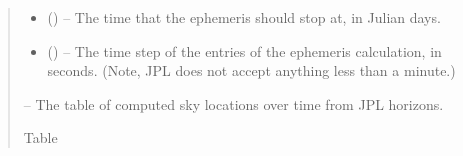 \documentclass[letterpaper,11pt,english]{sphinxmanual}
\begin{document}
\begin{savenotes}
\begin{fulllineitems}
\begin{savenotes}
\begin{fulllineitems}
\begin{quote}
\begin{description}
\begin{itemize}
\item {} 
\sphinxAtStartPar
{} () – The time that the ephemeris should stop at, in Julian days.

\item {} 
\sphinxAtStartPar
{} () – The time step of the entries of the ephemeris calculation, in
seconds. (Note, JPL does not accept anything less than a minute.)

\end{itemize}

\sphinxAtStartPar
{} – The table of computed sky locations over time from JPL horizons.

\sphinxAtStartPar
Table

\end{description}\end{quote}

\end{fulllineitems}\end{savenotes}



\end{fulllineitems}
\end{savenotes}
\end{document}
